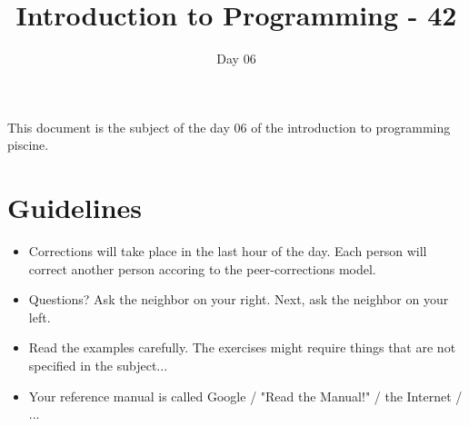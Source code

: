 \documentclass{42-en}
\begin{document}
\title{Introduction to Programming - 42}
\subtitle{Day 06}


\summary
{
This document is the subject of the day 06 of the introduction to programming piscine.
}

\maketitle

\tableofcontents



\chapter{Guidelines}

\begin{itemize}

  \item Corrections will take place in the last hour of the day. Each person will correct another person accoring to the peer-corrections model.
 
  \item Questions? Ask the neighbor on your right. Next, ask the neighbor on your left.
  
  \item Read the examples carefully. The exercises might require things that are not specified in the subject...

  \item Your reference manual is called Google / "Read the Manual!" / the Internet / ...

\end{itemize}

\newpage


\end{document}
